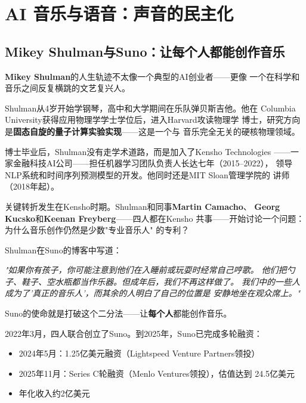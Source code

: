 \section{AI 音乐与语音：声音的民主化}
\label{sec:founders-audio}

\subsection{Mikey Shulman与Suno：让每个人都能创作音乐}
\label{subsec:founders-suno}

\textbf{Mikey Shulman}的人生轨迹不太像一个典型的AI创业者——更像
一个在科学和音乐之间反复横跳的文艺复兴人。

Shulman从4岁开始学钢琴，高中和大学期间在乐队弹贝斯吉他。他在
Columbia University获得应用物理学学士学位后，进入Harvard攻读物理学
博士，研究方向是\textbf{固态自旋的量子计算实验实现}——这是一个与
音乐完全无关的硬核物理领域。

博士毕业后，Shulman没有走学术道路，而是加入了Kensho Technologies
——一家金融科技AI公司——担任机器学习团队负责人长达七年（2015--2022），
领导NLP系统和时间序列预测模型的开发。他同时还是MIT Sloan管理学院的
讲师（2018年起）。

关键转折发生在Kensho时期。Shulman和同事\textbf{Martin Camacho}、
\textbf{Georg Kucsko}和\textbf{Keenan Freyberg}——四人都在Kensho
共事——开始讨论一个问题：为什么音乐创作仍然是少数"专业音乐人"
的专利？

\begin{whybox}[Suno的起源洞察]
Shulman在Suno的博客中写道：

\textit{"如果你有孩子，你可能注意到他们在入睡前或玩耍时经常自己哼歌。
他们把勺子、鞋子、空水瓶都当作乐器。但成年后，我们不再这样做了。
我们中的一些人成为了'真正的音乐人'，而其余的人明白了自己的位置是
安静地坐在观众席上。"}

Suno的使命就是打破这个二分法——让\textbf{每个人}都能创作音乐。
\end{whybox}

2022年3月，四人联合创立了Suno。到2025年，Suno已完成多轮融资：

\begin{itemize}
  \item 2024年5月：1.25亿美元融资（Lightspeed Venture Partners领投）
  \item 2025年11月：Series C轮融资（Menlo Ventures领投），估值达到
    24.5亿美元
  \item 年化收入约2亿美元
\end{itemize}

